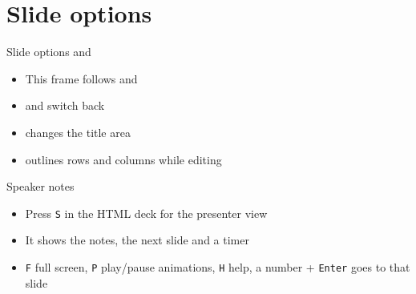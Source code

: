 \section{Slide options}

\TitleBarOff
\FooterNumberOnly
\begin{frame}{Slide options}{ and }
  \begin{itemize}
    \item This frame follows  and 
    \item {} and  switch back
    \item {} changes the title area
    \item {} outlines rows and columns while editing
  \end{itemize}
\end{frame}
\TitleBarOn
\FooterOn

\begin{frame}{Speaker notes}
  \begin{itemize}
    \item Press \texttt{S} in the HTML deck for the presenter view
    \item It shows the notes, the next slide and a timer
    \item \texttt{F} full screen, \texttt{P} play/pause animations, \texttt{H} help,
          a number + \texttt{Enter} goes to that slide
  \end{itemize}
\end{frame}
